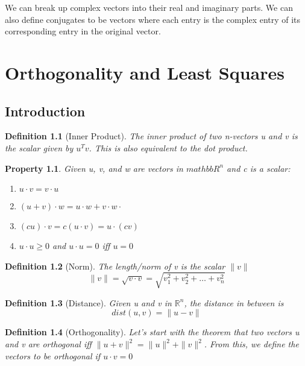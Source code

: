 \documentclass[12pt]{report}
\newtheorem{dfn}{Definition}
\newtheorem{prop}{Property}
\begin{document}
We can break up complex vectors into their real and imaginary parts. We can also define conjugates to be vectors where each entry is the complex entry of its corresponding entry in the original vector.

\chapter{Orthogonality and Least Squares}

\section{Introduction}

\begin{dfn}[Inner Product]
The inner product of two n-vectors u and v is the scalar given by $u^Tv$. This is also equivalent to the dot product.
\end{dfn}

\begin{prop}
Given u, v, and w are vectors in $mathbb{R}^n$ and c is a scalar:
\begin{enumerate}
\item $u \cdot v = v \cdot u$
\item $(u+v)\cdot w = u\cdot w + v\cdot w\cdot$
\item $(cu)\cdot v = c(u \cdot v) = u \cdot (cv)$
\item $u\cdot u \geq 0$ and $u \cdot u = 0$ iff $u = 0$
\end{enumerate}
\end{prop}

\begin{dfn}[Norm]
The length/norm of v is the scalar $\|v\|$
\begin{equation}
\|v\| = \sqrt{v\cdot v} = \sqrt{v_1^2+v_2^2+\ldots+v_n^2}
\end{equation}
\end{dfn}

\begin{dfn}[Distance]
Given u and v in $\mathbb{R}^n$, the distance in between is
\begin{equation}
dist(u, v) = \|u-v\|
\end{equation}
\end{dfn}

\begin{dfn}[Orthogonality]
Let's start with the theorem that two vectors u and v are orthogonal iff $\|u+v\|^2=\|u\|^2+\|v\|^2$.
From this, we define the vectors to be orthogonal if $u\cdot v = 0$
\end{dfn}
\end{document}
